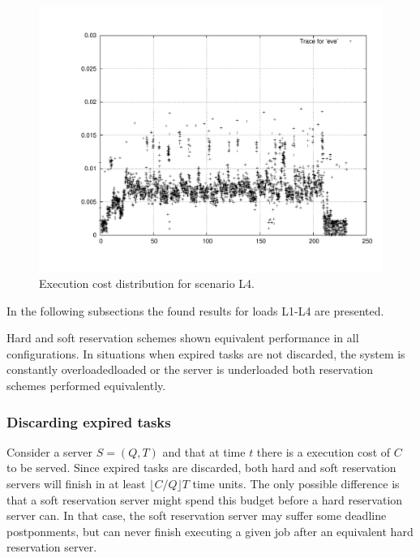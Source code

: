 \documentclass[times, 10pt,twocolumn]{article}
\begin{document}
\begin{figure}[t]
  \centering
  \includegraphics[scale=0.33]{trace-eve}
  \caption{Execution cost distribution for scenario L4.}
  \label{fig:plotl4}
\end{figure}

In the following subsections the found results for loads L1-L4 are presented. 

\label{sec:noDifference}

Hard and soft reservation schemes shown equivalent performance in all
configurations.  In situations when expired tasks are not discarded,
the system is constantly overloadedloaded or the server is underloaded
both reservation schemes performed equivalently.

\subsubsection{Discarding expired tasks}
\label{sec:disc-expir-tasks}

Consider a server $S = (Q,T)$ and that at time $t$ there is a
execution cost of $C$ to be served.  Since expired tasks are
discarded, both hard and soft reservation servers will finish in at
least $\lfloor C/Q \rfloor T$ time units.  The only possible
difference is that a soft reservation server might spend this budget
before a hard reservation server can. In that case, the soft
reservation server may suffer some deadline postponments, but can
never finish executing a given job after an equivalent hard
reservation server.
\end{document}
